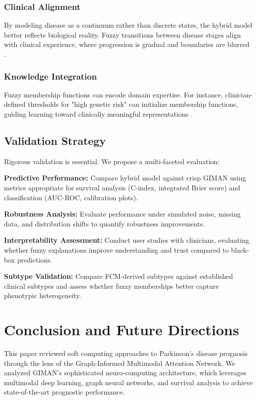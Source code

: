 \documentclass[conference]{IEEEtran}
\begin{document}
\subsubsection{Clinical Alignment}
By modeling disease as a continuum rather than discrete states, the hybrid model better reflects biological reality. Fuzzy transitions between disease stages align with clinical experience, where progression is gradual and boundaries are blurred \cite{dubois2014advancing}.

\subsubsection{Knowledge Integration}
Fuzzy membership functions can encode domain expertise. For instance, clinician-defined thresholds for "high genetic risk" can initialize membership functions, guiding learning toward clinically meaningful representations \cite{torres2006fuzzy}.

\subsection{Validation Strategy}

Rigorous validation is essential. We propose a multi-faceted evaluation:

\textbf{Predictive Performance:} Compare hybrid model against crisp GIMAN using metrics appropriate for survival analysis (C-index, integrated Brier score) and classification (AUC-ROC, calibration plots).

\textbf{Robustness Analysis:} Evaluate performance under simulated noise, missing data, and distribution shifts to quantify robustness improvements.

\textbf{Interpretability Assessment:} Conduct user studies with clinicians, evaluating whether fuzzy explanations improve understanding and trust compared to black-box predictions.

\textbf{Subtype Validation:} Compare FCM-derived subtypes against established clinical subtypes and assess whether fuzzy memberships better capture phenotypic heterogeneity.

\section{Conclusion and Future Directions}

This paper reviewed soft computing approaches to Parkinson's disease prognosis through the lens of the Graph-Informed Multimodal Attention Network. We analyzed GIMAN's sophisticated neuro-computing architecture, which leverages multimodal deep learning, graph neural networks, and survival analysis to achieve state-of-the-art prognostic performance.
\end{document}
